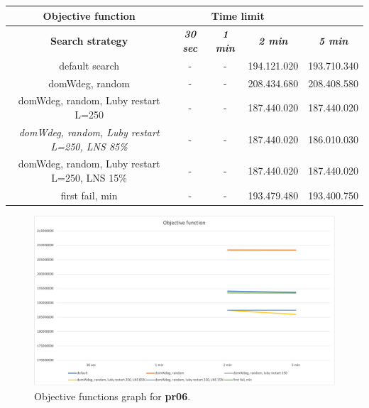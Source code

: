 {
\renewcommand{\arraystretch}{2}
\begin{longtable}[h]{| c | c | c | c | c |}
    \hline
    \textbf{Objective function} & \multicolumn{3}{c}{Time limit} & \\
    \hline
    \textbf{Search strategy} & \textbf{\textit{30 sec}} & \textbf{\textit{1 min}} & \textbf{\textit{2 min}} & \textbf{\textit{5 min}} \\
    \hline
    \endhead
    default search                                         & - & - & 194.121.020 & 193.710.340 \\
    \hline
    domWdeg, random                                        & - & - & 208.434.680 & 208.408.580 \\
    \hline
    domWdeg, random, Luby restart L=250                    & - & - & 187.440.020 & 187.440.020 \\
    \hline
    \textit{domWdeg, random, Luby restart L=250, LNS 85\%} & - & - & 187.440.020 & 186.010.030 \\
    \hline
    domWdeg, random, Luby restart L=250, LNS 15\%          & - & - & 187.440.020 & 187.440.020 \\
    \hline
    first fail, min                                        & - & - & 193.479.480 & 193.400.750 \\
    \hline
\end{longtable}
}
\begin{figure}[H]
    \centering
    \includegraphics[width=0.8\columnwidth]{../graphs/pr06-objf.png}
    \caption{Objective functions graph for \textbf{pr06}.}
\end{figure}

